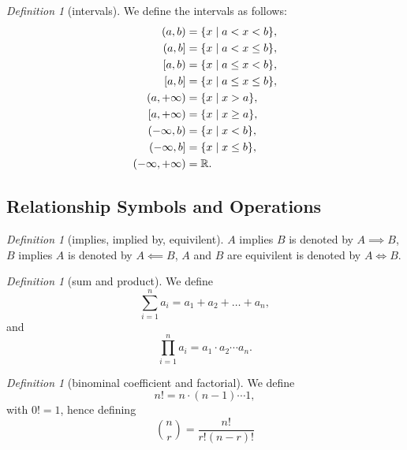 \documentclass[8pt]{article}
\theoremstyle{remark}
\newtheorem{definition}[theorem]{Definition}
\begin{document}
            \begin{definition}[intervals]
                We define the intervals as follows:
                \begin{align*}
                    (a, b) &= \{x \mid a < x < b\},\\
                    (a, b] &= \{x \mid a < x \leq b\},\\
                    [a, b) &= \{x \mid a \leq x < b\},\\
                    [a, b] &= \{x \mid a \leq x \leq b\},\\
                    (a, +\infty) &= \{x \mid x > a\},\\
                    [a, +\infty) &= \{x \mid x \geq a\},\\
                    (-\infty, b) &= \{x \mid x < b\},\\
                    (-\infty, b] &= \{x \mid x \leq b\},\\
                    (-\infty, +\infty) &= \mathbb{R}.
                \end{align*}
            \end{definition}

        \subsection{Relationship Symbols and Operations}
            \begin{definition}[implies, implied by, equivilent]
                $A$ implies $B$ is denoted by $A \implies B$, $B$ implies $A$ is denoted by $A \impliedby B$, $A$ and $B$ are equivilent is denoted by $A \iff B$.
            \end{definition}

            \begin{definition}[sum and product]
                We define
                $$
                    \sum_{i = 1}^{n} a_i = a_1 + a_2 + \ldots + a_n,
                $$
                and
                $$
                    \prod_{i = 1}^{n} a_i = a_1 \cdot a_2 \cdots a_n.
                $$
            \end{definition}

            \begin{definition}[binominal coefficient and factorial]
                We define
                $$
                    n! = n \cdot (n - 1) \cdots 1,
                $$
                with $0! = 1$, hence defining
                $$
                    \binom{n}{r} = \frac{n!}{r!(n-r)!}
                $$
            \end{definition}
        
\end{document}
